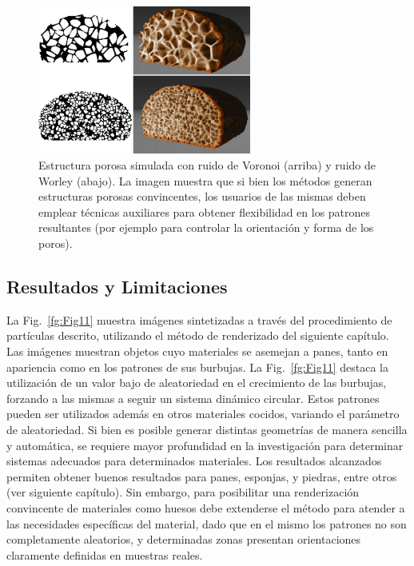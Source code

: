\begin{figure}
  \centerline{\includegraphics[width=7cm]{figures/Fig9CAVW}}
  \caption[Estructura porosa simulada con ruido de Voronoi y ruido de Worley]{Estructura porosa simulada con ruido de Voronoi (arriba) y ruido de Worley (abajo). La imagen muestra que si bien los métodos generan estructuras porosas convincentes, los usuarios de las mismas deben emplear técnicas auxiliares para obtener flexibilidad en los patrones resultantes (por ejemplo para controlar la orientación y forma de los poros).}
  \label{fg:Fig9}
\end{figure}

\subsection{Resultados y Limitaciones}
La Fig.~\ref{fg:Fig11} muestra imágenes sintetizadas a través del procedimiento de partículas descrito, utilizando el método de renderizado del siguiente capítulo.
Las imágenes muestran objetos cuyo materiales se asemejan a panes, tanto en apariencia como en los patrones de sus burbujas.
La Fig.~\ref{fg:Fig11} destaca la utilización de un valor bajo de aleatoriedad en el crecimiento de las burbujas, forzando a las mismas a seguir un sistema dinámico circular.
Estos patrones pueden ser utilizados adem\'as en otros materiales cocidos, variando el par\'ametro de aleatoriedad.
Si bien es posible generar distintas geometrías de manera sencilla y automática, se requiere mayor profundidad en la investigación para determinar sistemas adecuados para determinados materiales.
Los resultados alcanzados permiten obtener buenos resultados para panes, esponjas, y piedras, entre otros (ver siguiente capítulo).
Sin embargo, para posibilitar una renderización convincente de materiales como huesos debe extenderse el método para atender a las necesidades específicas del material, dado que en el mismo los patrones no son completamente aleatorios, y determinadas zonas presentan orientaciones claramente definidas en muestras reales.


